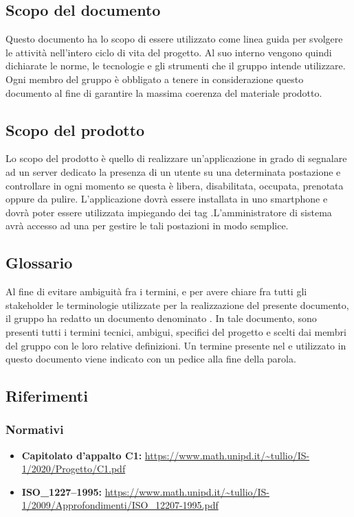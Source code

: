 \subsection{Scopo del documento}
Questo documento ha lo scopo di essere utilizzato come linea guida per svolgere le attività nell'intero ciclo di vita del progetto.
Al suo interno vengono quindi dichiarate le norme, le tecnologie e gli strumenti che il gruppo \Gruppo{} intende utilizzare.
Ogni membro del gruppo è obbligato a tenere in considerazione questo documento al fine di garantire la massima coerenza del materiale prodotto.
	
\subsection{Scopo del prodotto}
Lo scopo del prodotto è quello di realizzare un’applicazione in grado di segnalare ad un server
dedicato la presenza di un utente su una determinata postazione e controllare in ogni momento
se questa è libera, disabilitata, occupata, prenotata oppure da pulire. L’applicazione dovrà essere
installata in uno smartphone  e dovrà poter essere utilizzata impiegando
dei tag .L'amministratore di sistema avrà accesso ad una  per gestire le tali postazioni in modo semplice.

\subsection{Glossario}
Al fine di evitare ambiguità fra i termini, e per avere chiare fra tutti gli stakeholder le terminologie utilizzate per la realizzazione del presente documento, il gruppo \Gruppo{} ha redatto un documento denominato \Gv{}.
In tale documento, sono presenti tutti i termini tecnici, ambigui, specifici del progetto e scelti dai membri del gruppo con le loro relative definizioni.
Un termine presente nel \Gv{} e utilizzato in questo documento viene indicato con un pedice \glo{} alla fine della parola.

\subsection{Riferimenti} 
\subsubsection{Normativi}
\begin{itemize}
	\item \textbf{Capitolato d'appalto C1:} \url{https://www.math.unipd.it/~tullio/IS-1/2020/Progetto/C1.pdf}
	\item \textbf{ISO\_1227--1995:} \url{https://www.math.unipd.it/~tullio/IS-1/2009/Approfondimenti/ISO_12207-1995.pdf}
\end{itemize}

